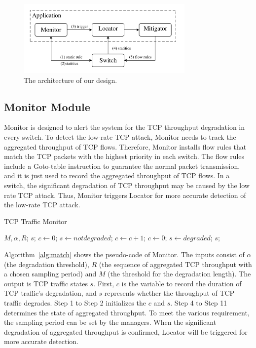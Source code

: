 \documentclass[conference]{IEEEtran}
\begin{document}
\begin{figure}
\vspace{0in}
\centering
\includegraphics[width=3.4in]{Design/architecture.pdf}
\vspace{-0.1in}
\caption{\small{The architecture of our design.}}
\label{fig:architecture}
\vspace{-0.2in}
\end{figure}


\subsection{Monitor Module}
Monitor is designed to alert the system for the TCP throughput degradation in every switch. To detect the low-rate TCP attack, Monitor needs to track the aggregated throughput of TCP flows. Therefore, Monitor installs flow rules that match the TCP packets with the highest priority in each switch. The flow rules include a Goto-table instruction to guarantee the normal packet transmission, and it is just used to record the aggregated throughput of TCP flows. In a switch, the significant degradation of TCP throughput may be caused by the low rate TCP attack. Thus, Monitor triggers Locator for more accurate detection of the low-rate TCP attack. 


\begin{algorithm}[H]
  \caption{TCP Traffic Monitor}
  \label{alg:match}
  \begin{algorithmic}[1]
  \REQUIRE $M, \alpha, R$;
  \ENSURE $s$;
  \STATE $c \gets 0$;
  \STATE $s \gets not degraded$;
        \STATE $c \gets c + 1$;
    \ELSE 
        \STATE $c \gets 0$;
    \ENDIF
        \STATE $s \gets degraded$;
    \ENDIF
  \ENDFOR
  \RETURN $s$;
  \end{algorithmic}
\end{algorithm}

Algorithm~\ref{alg:match} shows the pseudo-code of Monitor. The inputs consist of $\alpha$ (the degradation threshold), $R$ (the sequence of aggregated TCP throughput with a chosen sampling period) and $M$ (the threshold for the degradation length). The output is TCP traffic states $s$. First, $c$ is the variable to record the duration of TCP traffic's degradation, and $s$ represents whether the throughput of TCP traffic degrades. Step 1 to Step 2 initializes the $c$ and $s$. Step 4 to Step 11 determines the state of aggregated throughput. To meet the various requirement, the sampling period can be set by the managers. When the significant degradation of aggregated throughput is confirmed, Locator will be triggered for more accurate detection.
\end{document}
